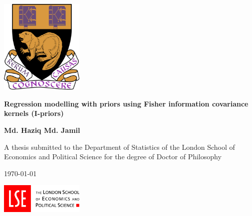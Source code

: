 \documentclass[a4paper,showframes]{report}
\begin{document}
\begin{titlepage}
  \singlespacing
  \begin{center}
    
    \vspace*{0.1cm}
     
    \includegraphics[width=0.3\textwidth]{figure/lse_coat_of_arms_1024}
    \vspace{2cm}
    
    \LARGE
    {\textbf{Regression modelling with priors using Fisher information covariance kernels (I-priors)}}
    \vspace{1.5cm}
    
    \Large 
    \textbf{Md. Haziq Md. Jamil}
    \vfill
    
    \normalsize
    A thesis submitted to the Department of Statistics of the London School of Economics and Political Science for the degree of Doctor of Philosophy
    \vspace{1cm}
    
    \UKvardate
    \today
    \vspace{1cm}
    
    \includegraphics[width=0.3\textwidth]{figure/lse_logo_1024}
  
  \end{center}
\end{titlepage}
\end{document}
